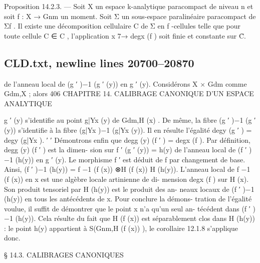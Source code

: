 \documentclass[
  10pt,
]{article}
\newenvironment{Shaded}{}{}
\newcommand{\NormalTok}[1]{#1}
\begin{document}
\begin{Shaded}
\begin{Highlighting}[]
\NormalTok{Proposition 14.2.3. — Soit X un espace k{-}analytique paracompact de niveau n et}
\NormalTok{soit f : X → Gnm un moment. Soit Σ un sous{-}espace paralinéaire paracompact de Σf .}
\NormalTok{Il existe une décomposition cellulaire C de Σ en f {-}cellules telle que pour toute cellule}
\NormalTok{C ∈ C , l’application x 7→ degx (f ) soit finie et constante sur C̊.}
\end{Highlighting}
\end{Shaded}

\subsection{CLD.txt, newline lines
20700--20870}\label{cld.txt-newline-lines-2070020870}

\begin{Shaded}
\begin{Highlighting}[]
\NormalTok{de l’anneau local de (g ′ )−1 (g ′ (y)) en g ′ (y). Considérons X × Gdm comme Gdm,X ; alors}
\NormalTok{406           CHAPITRE 14. CALIBRAGE CANONIQUE D’UN ESPACE ANALYTIQUE}

\NormalTok{g ′ (y) s’identifie au point g|Yx (y) de Gdm,H (x) . De même, la fibre (g ′ )−1 (g ′ (y)) s’identifie à}
\NormalTok{la fibre (g|Yx )−1 (g|Yx (y)). Il en résulte l’égalité degy (g ′ ) = degy (g|Yx ).}
\NormalTok{                                   ′                                            ′}
\NormalTok{     Démontrons enfin que degg (y) (f ′ ) = degx (f ). Par définition, degg (y) (f ′ ) est la dimen{-}}
\NormalTok{sion sur f ′ (g ′ (y)) = h(y) de l’anneau local de (f ′ )−1 (h(y)) en g ′ (y). Le morphisme f ′}
\NormalTok{est déduit de f par changement de base. Ainsi, (f ′ )−1 (h(y)) = f −1 (f (x)) ⊗H (f (x))}
\NormalTok{H (h(y)). L’anneau local de f −1 (f (x)) en x est une algèbre locale artinienne de di{-}}
\NormalTok{mension degx (f ) sur H (x). Son produit tensoriel par H (h(y)) est le produit des an{-}}
\NormalTok{neaux locaux de (f ′ )−1 (h(y)) en tous les antécédents de x. Pour conclure la démons{-}}
\NormalTok{tration de l’égalité voulue, il suffit de démontrer que le point x n’a qu’un seul an{-}}
\NormalTok{técédent dans (f ′ )−1 (h(y)). Cela résulte du fait que H (f (x)) est séparablement clos}
\NormalTok{dans H (h(y)) : le point h(y) appartient à S(Gnm,H (f (x)) ), le corollaire 12.1.8 s’applique}
\NormalTok{donc.}



\NormalTok{                        § 14.3. CALIBRAGES CANONIQUES}


\end{Highlighting}
\end{Shaded}
\end{document}
